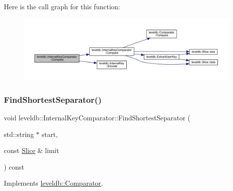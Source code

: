 Here is the call graph for this function\+:
\nopagebreak
\begin{figure}[H]
\begin{center}
\leavevmode
\includegraphics[width=350pt]{classleveldb_1_1_internal_key_comparator_a715d8e2eb246df39248ce54789fb4621_cgraph}
\end{center}
\end{figure}
\mbox{\label{classleveldb_1_1_internal_key_comparator_a876984ae99b1404b4074be4d92cab421}} 
\subsubsection{\texorpdfstring{FindShortestSeparator()}{FindShortestSeparator()}}
{\footnotesize\ttfamily void leveldb\+::\+Internal\+Key\+Comparator\+::\+Find\+Shortest\+Separator (\begin{DoxyParamCaption}\item[{std\+::string $\ast$}]{start,  }\item[{const \mbox{\hyperlink{classleveldb_1_1_slice}{Slice}} \&}]{limit }\end{DoxyParamCaption}) const\hspace{0.3cm}{\ttfamily [virtual]}}



Implements \mbox{\hyperlink{structleveldb_1_1_comparator_abdfe6076225e95b91ffd94f646063115}{leveldb\+::\+Comparator}}.


